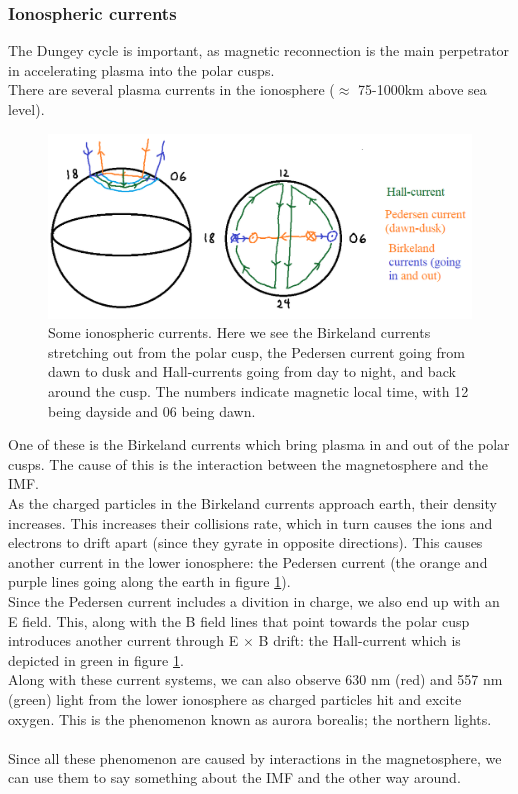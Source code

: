 \documentclass[norsk,a4paper,12pt]{article}
\begin{document}
\begin{multicols}{2}
	\subsubsection{Ionospheric currents}
	The Dungey cycle is important, as magnetic reconnection is the main perpetrator in accelerating plasma into the polar cusps.\\
	There are several plasma currents in the ionosphere ($\approx$ 75-1000km above sea level).
	\begin{figure}[H]
		\includegraphics[scale = 0.4]{Figures/ionosphere_currents.png}
		\centering
		\caption{Some ionospheric currents. Here we see the Birkeland currents stretching out from the polar cusp, the Pedersen current going from dawn to dusk and Hall-currents going from day to night, and back around the cusp. The numbers indicate magnetic local time, with 12 being dayside 			and 06 being dawn.}
		\label{fig::ionosphere}
	\end{figure}
	One of these is the Birkeland currents which bring plasma in and out of the polar cusps. The cause of this is the interaction between the magnetosphere and 	the IMF.\\
	As the charged particles in the Birkeland currents approach earth, their density increases. This increases their collisions rate, which in turn causes the ions 			and electrons to drift apart (since they gyrate in opposite directions). This causes another current in the lower ionosphere: the Pedersen current (the orange 	and purple lines 	going along the earth in figure \ref{fig::ionosphere}).\\
	Since the Pedersen current includes a divition in charge, we also end up with an E field. This, along with the B field lines that point towards the polar cusp 			introduces another current through E $\times$ B drift: the Hall-current which is depicted in green in figure \ref{fig::ionosphere}.\\
	Along with these current systems, we can also observe 630 nm (red) and 557 nm (green) light from the lower ionosphere as charged particles hit and 			excite oxygen. This is the phenomenon known as aurora borealis; the northern lights.\\
	\\
	Since all these phenomenon are caused by interactions in the magnetosphere, we can use them to say something about the IMF and the other way around. 	



\end{multicols}
\end{document}
